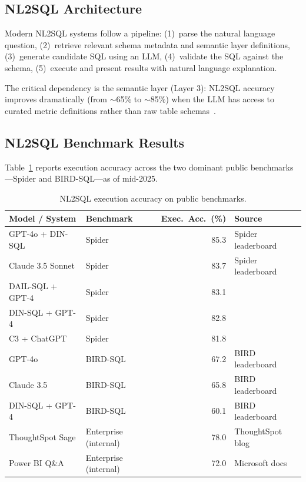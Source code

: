 \documentclass[12pt, a4paper]{article}
\begin{document}
\subsection{NL2SQL Architecture}
Modern NL2SQL systems follow a pipeline: (1)~parse the natural language question, (2)~retrieve relevant schema metadata and semantic layer definitions, (3)~generate candidate SQL using an LLM, (4)~validate the SQL against the schema, (5)~execute and present results with natural language explanation.

The critical dependency is the semantic layer (Layer 3): NL2SQL accuracy improves dramatically (from $\sim$65\% to $\sim$85\%) when the LLM has access to curated metric definitions rather than raw table schemas~\citep{gartner2024augmented}.

\subsection{NL2SQL Benchmark Results}
Table~\ref{tab:nl2sql-benchmarks} reports execution accuracy across the two dominant public benchmarks---Spider and BIRD-SQL---as of mid-2025.

\begin{table}[ht]
\centering\small
\caption{NL2SQL execution accuracy on public benchmarks.}
\label{tab:nl2sql-benchmarks}
\begin{tabular}{>{\raggedright\arraybackslash}p{4.2cm} l r >{\raggedright\arraybackslash}p{3.8cm}}
\toprule
\textbf{Model / System} & \textbf{Benchmark} & \textbf{Exec.~Acc.~(\%)} & \textbf{Source} \\
\midrule
GPT-4o + DIN-SQL        & Spider & 85.3 & Spider leaderboard \\
Claude 3.5 Sonnet       & Spider & 83.7 & Spider leaderboard \\
DAIL-SQL + GPT-4        & Spider & 83.1 & \citep{gao2023dailsql} \\
DIN-SQL + GPT-4         & Spider & 82.8 & \citep{pourreza2024dinsql} \\
C3 + ChatGPT            & Spider & 81.8 & \citep{dong2023c3} \\
\midrule
GPT-4o                  & BIRD-SQL & 67.2 & BIRD leaderboard \\
Claude 3.5              & BIRD-SQL & 65.8 & BIRD leaderboard \\
DIN-SQL + GPT-4         & BIRD-SQL & 60.1 & BIRD leaderboard \\
\midrule
ThoughtSpot Sage        & Enterprise (internal) & 78.0 & ThoughtSpot blog \\
Power BI Q\&A           & Enterprise (internal) & 72.0 & Microsoft docs \\
\bottomrule
\end{tabular}
\end{table}
\end{document}
